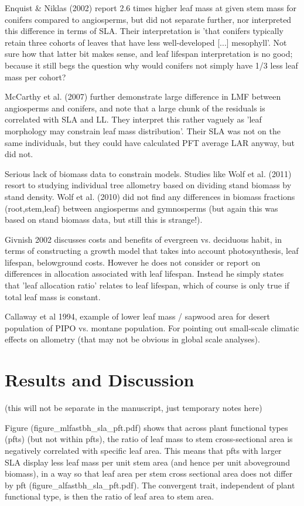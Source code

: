 \documentclass[a4paper]{article}
\begin{document}
Enquist & Niklas (2002) report 2.6 times higher leaf mass at given stem mass for conifers compared to angiosperms, but did not separate further, nor interpreted this difference in terms of SLA. Their interpretation is 'that conifers typically retain three cohorts of leaves that have less well-developed [...] mesophyll'. Not sure how that latter bit makes sense, and leaf lifespan interpretation is no good; because it still begs the question why would conifers not simply have 1/3 less leaf mass per cohort? 

McCarthy et al. (2007) further demonstrate large difference in LMF between angiosperms and conifers, and note that a large chunk of the residuals is correlated with SLA and LL. They interpret this rather vaguely as 'leaf morphology may constrain leaf mass distribution'. Their SLA was not on the same individuals, but they could have calculated PFT average LAR anyway, but did not.

Serious lack of biomass data to constrain models. Studies like Wolf et al. (2011) resort to studying individual tree allometry based on dividing stand biomass by stand density. Wolf et al. (2010) did not find any differences in biomass fractions (root,stem,leaf) between angiosperms and gymnosperms (but again this was based on stand biomass data, but still this is strange!).

Givnish 2002 discusses costs and benefits of evergreen vs. deciduous habit, in terms of constructing a growth model that takes into account photosynthesis, leaf lifespan, belowground costs. However he does not consider or report on differences in allocation associated with leaf lifespan. Instead he simply states that 'leaf allocation ratio' relates to leaf lifespan, which of course is only true if total leaf mass is constant.

Callaway et al 1994, example of lower leaf mass / sapwood area for desert population of PIPO vs. montane population. For pointing out small-scale climatic effects on allometry (that may not be obvious in global scale analyses).


\section{Results and Discussion}
(this will not be separate in the manuscript, just temporary notes here)

Figure (figure\_mlfastbh\_sla\_pft.pdf) shows that across plant functional types (pfts) (but not within pfts), the ratio of leaf mass to stem cross-sectional area is negatively correlated with specific leaf area. This means that pfts with larger SLA display less leaf mass per unit stem area (and hence per unit aboveground biomass), in a way so that leaf area per stem cross sectional area does not differ by pft (figure\_alfastbh\_sla\_pft.pdf). The convergent trait, independent of plant functional type, is then the ratio of leaf area to stem area.
\end{document}
